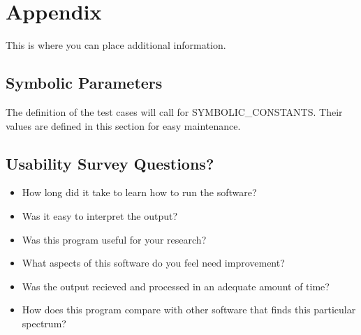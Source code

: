 \documentclass[12pt, titlepage]{article}
\begin{document}




\newpage

\section{Appendix}

This is where you can place additional information.

\subsection{Symbolic Parameters}

The definition of the test cases will call for SYMBOLIC\_CONSTANTS.
Their values are defined in this section for easy maintenance.

\subsection{Usability Survey Questions?}


\begin{itemize}
	\item How long did it take to learn how to run the software? 
	\item Was it easy to interpret the output? 
	\item Was this program useful for your research? 
	\item What aspects of this software do you feel need improvement?
	\item Was the output recieved and processed in an adequate amount of time?
	\item How does this program compare with other software that finds this 
	particular spectrum?
\end{itemize}
\end{document}
